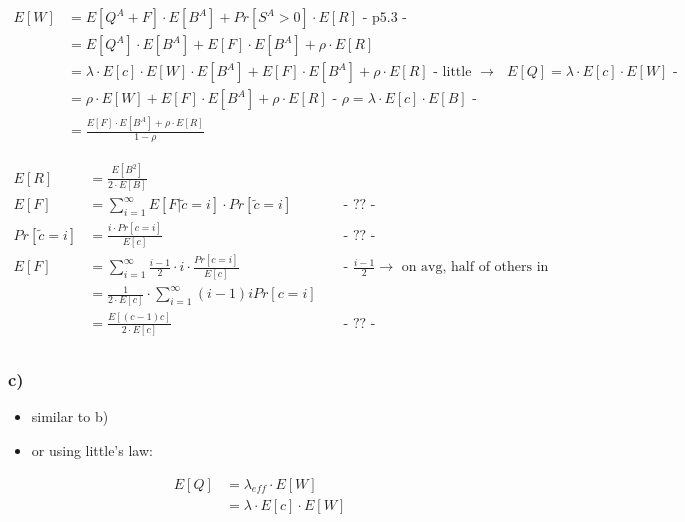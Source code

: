 \begin{align*}
E\left[W\right]&=E\left[Q^{A}+F\right]\cdot E\left[B^{A}\right]+Pr\left[S^{A}> 0\right]\cdot E\left[R\right] \text{ - p5.3 -}\\
&=E\left[Q^{A}\right]\cdot E\left[B^{A}\right]+E\left[F\right]\cdot E\left[B^{A}\right]+\rho \cdot E\left[R\right]\\
&=\lambda \cdot E\left[c\right]\cdot E\left[W\right] \cdot E\left[B^A\right]+E\left[F\right]\cdot E\left[B^{A}\right]+\rho \cdot E\left[R\right] \text{ - little $\rightarrow$ $E\left[Q\right]=\lambda \cdot E\left[c\right]\cdot E\left[W\right]$ -}\\
&=\rho \cdot E\left[W\right]+E\left[F\right]\cdot E\left[B^{A}\right]+\rho \cdot E\left[R\right] \text{ -  $\rho = \lambda \cdot E[c] \cdot E[B]$ -}\\
&=\frac{E\left[F\right]\cdot E\left[B^{A}\right]+\rho \cdot E\left[R\right]}{1-\rho }
\end{align*}

\begin{align*}
E\left[R\right]&=\frac{E\left[B^{2}\right]}{2\cdot E\left[B\right]}\\
E\left[F\right]&=\sum _{{i=1}}^{\infty }E\left[F|\widetilde{c}=i\right]\cdot Pr\left[\widetilde{c}=i\right] && \text{ - ?? - }\\
Pr\left[\widetilde{c}=i\right]&=\frac{i\cdot Pr\left[c=i\right]}{E\left[c\right]} && \text{ - ?? - }\\
E\left[F\right]&=\sum _{{i=1}}^{\infty }\frac{i-1}{2}\cdot i\cdot \frac{Pr\left[c=i\right]}{E\left[c\right]} && \text{ - $\frac{i-1}{2} \rightarrow$ on avg, half of others in batch are in front of you - }\\
&=\frac{1}{2\cdot E\left[c\right]}\cdot \sum _{{i=1}}^{\infty }\left(i-1\right)i Pr\left[c=i\right]\\
&=\frac{E\left[\left(c-1\right)c\right]}{2\cdot E\left[c\right]} && \text{ - ?? - }\\
\end{align*}

\subsubsection*{ c) }

\begin{itemize}
\item  similar to b)
\item  or using little's law:
\end{itemize}
\begin{align*}
E\left[Q\right]&=\lambda _{{eff}}\cdot E\left[W\right]\\
&=\lambda \cdot E\left[c\right]\cdot E\left[W\right]
\end{align*}